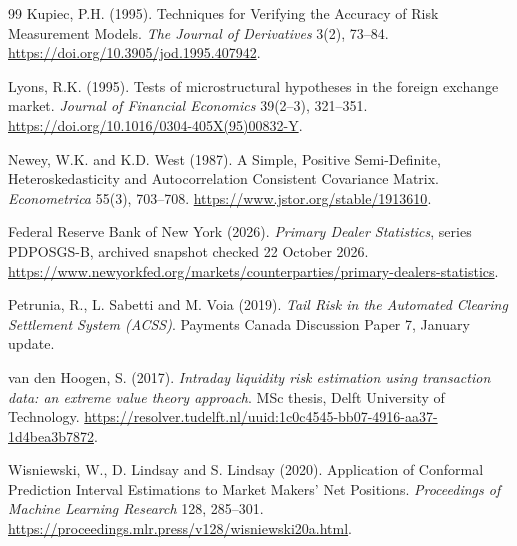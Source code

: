 \begin{thebibliography}{99}
 Kupiec, P.H. (1995).
Techniques for Verifying the Accuracy of Risk Measurement Models. \emph{The Journal of Derivatives} 3(2), 73--84. \url{https://doi.org/10.3905/jod.1995.407942}.

 Lyons, R.K. (1995).
Tests of microstructural hypotheses in the foreign exchange market. \emph{Journal of Financial Economics} 39(2--3), 321--351. \url{https://doi.org/10.1016/0304-405X(95)00832-Y}.

 Newey, W.K. and K.D. West (1987).
A Simple, Positive Semi-Definite, Heteroskedasticity and Autocorrelation Consistent Covariance Matrix.
\emph{Econometrica} 55(3), 703--708. \url{https://www.jstor.org/stable/1913610}.

 Federal Reserve Bank of New York (2026).
\emph{Primary Dealer Statistics}, series PDPOSGS-B, archived snapshot checked 22 October 2026.
\url{https://www.newyorkfed.org/markets/counterparties/primary-dealers-statistics}.

 Petrunia, R., L. Sabetti and M. Voia (2019).
\emph{Tail Risk in the Automated Clearing Settlement System (ACSS)}. Payments Canada Discussion Paper 7, January update.

 van den Hoogen, S. (2017).
\emph{Intraday liquidity risk estimation using transaction data: an extreme value theory approach}.
MSc thesis, Delft University of Technology. \url{https://resolver.tudelft.nl/uuid:1c0c4545-bb07-4916-aa37-1d4bea3b7872}.

 Wisniewski, W., D. Lindsay and S. Lindsay (2020).
Application of Conformal Prediction Interval Estimations to Market Makers' Net Positions.
\emph{Proceedings of Machine Learning Research} 128, 285--301. \url{https://proceedings.mlr.press/v128/wisniewski20a.html}.
\end{thebibliography}
\endgroup
